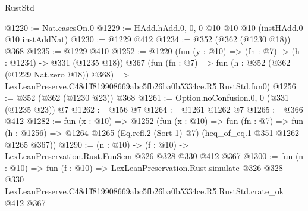 \begin{lexlean}{RustStd}
\begin{coremodule}
@1220 := Nat.casesOn.{0}
@1229 := HAdd.hAdd.{0, 0, 0} @10 @10 @10 (instHAdd.{0} @10 instAddNat)
@1230 := @1229 @412
@1234 := @352 (@362 (@1230 @18)) @368
@1235 := @1229 @410
@1252 := @1220
    (fun (y : @10) => (fn : @7) -> (h : @1234) -> @331 (@1235 @18))
    @367
    (fun (fn : @7) =>
    fun (h : @352 (@362 (@1229 Nat.zero @18)) @368) =>
    LexLeanPreserve.C48dff819908669abc5fb26ba0b5334ce.R5.RustStd.fun0)
@1256 := @352 (@362 (@1230 @23)) @368
@1261 := Option.noConfusion.{0, 0} (@331 (@1235 @23)) @7
@1262 := @156 @7
@1264 := @1261 @1262 @7
@1265 := @366 @412
@1282 := fun (x : @10) =>
  @1252
    (fun (x : @10) =>
    fun (fn : @7) =>
    fun (h : @1256) => @1264 @1265 (Eq.refl.{2} (Sort 1) @7) (heq_of_eq.{1} @351 @1262 @1265 @367))
@1290 := (n : @10) -> (f : @10) -> LexLeanPreservation.Rust.FunSem @326 @328 @330 @412 @367
@1300 := fun (n : @10) =>
  fun (f : @10) =>
  LexLeanPreservation.Rust.simulate
    @326
    @328
    @330
    LexLeanPreserve.C48dff819908669abc5fb26ba0b5334ce.R5.RustStd.crate_ok
    @412
    @367
\end{coremodule}
\end{lexlean}
